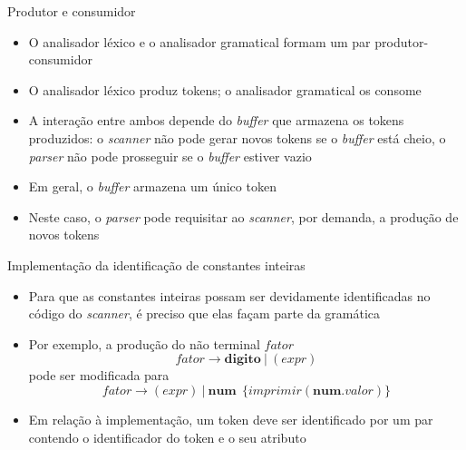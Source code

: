 \begin{frame}[fragile]{Produtor e consumidor}

    \begin{itemize}
        \item O analisador léxico e o analisador gramatical formam um par produtor-consumidor

        \item O analisador léxico produz tokens; o analisador gramatical os consome

        \item A interação entre ambos depende do \textit{buffer} que armazena os tokens produzidos: o \textit{scanner} não pode gerar novos tokens se o
            \textit{buffer} está cheio, o \textit{parser} não pode prosseguir se o \textit{buffer} estiver vazio

        \item Em geral, o \textit{buffer} armazena um único token

        \item Neste caso, o \textit{parser} pode requisitar ao \textit{scanner}, por demanda, a produção de novos tokens
    \end{itemize}

\end{frame}

\begin{frame}[fragile]{Implementação da identificação de constantes inteiras}

    \begin{itemize}
        \item Para que as constantes inteiras possam ser devidamente identificadas no código do \textit{scanner}, é preciso que elas façam parte da
            gramática

        \item Por exemplo, a produção do não terminal $fator$ 
        \[
            fator \to \mathbf{digito}\ |\ (expr)
        \]
        pode ser modificada para
        \[
            fator \to (expr)\ |\ \mathbf{num}\ \ \{imprimir(\mathbf{num}.valor)\}
        \]

        \item Em relação à implementação, um token deve ser identificado por um par contendo o identificador do token e o seu atributo
    \end{itemize}

\end{frame}

